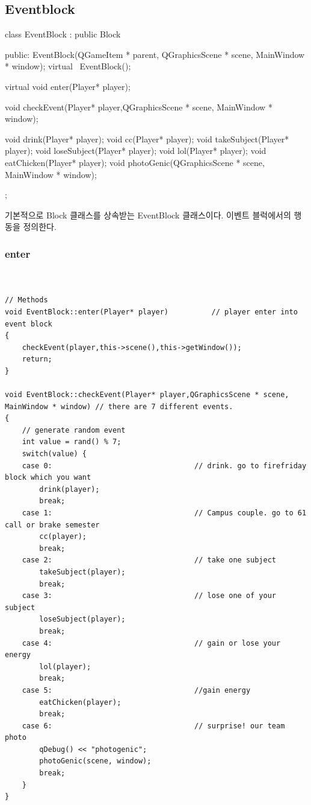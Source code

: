 \documentclass[10pt,oneside,a4paper,titlepage]{article}
\begin{document}
\subsection{Eventblock}

class EventBlock : public Block
{
public:
    EventBlock(QGameItem * parent, QGraphicsScene * scene, MainWindow * window);
    virtual ~EventBlock();

    virtual void enter(Player* player);

    void checkEvent(Player* player,QGraphicsScene * scene, MainWindow * window);

    void drink(Player* player);
    void cc(Player* player);
    void takeSubject(Player* player);
    void loseSubject(Player* player);
    void lol(Player* player);
    void eatChicken(Player* player);
    void photoGenic(QGraphicsScene * scene, MainWindow * window);
};

기본적으로 Block 클래스를 상속받는 EventBlock 클래스이다. 이벤트 블럭에서의 행동을 정의한다.


\subsubsection{enter}

\begin{lstlisting}


// Methods
void EventBlock::enter(Player* player)          // player enter into event block
{
    checkEvent(player,this->scene(),this->getWindow());
    return;
}

void EventBlock::checkEvent(Player* player,QGraphicsScene * scene, MainWindow * window) // there are 7 different events.
{
    // generate random event
    int value = rand() % 7;
    switch(value) {
    case 0:                                 // drink. go to firefriday block which you want
        drink(player);
        break;
    case 1:                                 // Campus couple. go to 61 call or brake semester
        cc(player);
        break;
    case 2:                                 // take one subject
        takeSubject(player);
        break;
    case 3:                                 // lose one of your subject
        loseSubject(player);
        break;
    case 4:                                 // gain or lose your energy
        lol(player);
        break;
    case 5:                                 //gain energy    
        eatChicken(player);
        break;
    case 6:                                 // surprise! our team photo
        qDebug() << "photogenic";
        photoGenic(scene, window);
        break;
    }
}
\end{lstlisting}
\end{document}
